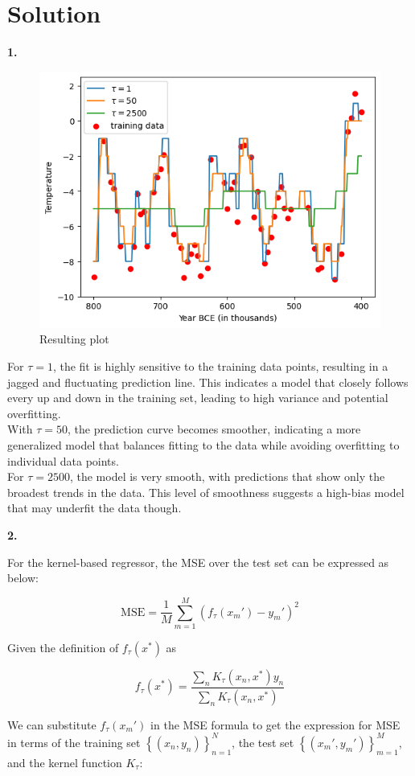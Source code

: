 \documentclass[submit]{harvardml}
\newenvironment{solution}
  {\color{blue}\section*{Solution}}
{}
\begin{document}
\begin{solution}

\textbf{1.}

\begin{figure}[h]
    \centering
    \includegraphics[width=0.5\linewidth]{image.png}
    \caption{Resulting plot}
    \label{fig:enter-label}
\end{figure}

For \(\tau = 1\), the fit is highly sensitive to the training data points, resulting in a jagged and fluctuating prediction line. This indicates a model that closely follows every up and down in the training set, leading to high variance and potential overfitting.\\

With \(\tau = 50\), the prediction curve becomes smoother, indicating a more generalized model that balances fitting to the data while avoiding overfitting to individual data points.\\

For \(\tau = 2500\), the model is very smooth, with predictions that show only the broadest trends in the data. This level of smoothness suggests a high-bias model that may underfit the data though.

\bigskip
\textbf{2.}

For the kernel-based regressor, the MSE over the test set can be expressed as below:

$$
\text{MSE} = \frac{1}{M} \sum_{m=1}^M \left(f_\tau(x_m') - y_m'\right)^2
$$

Given the definition of \(f_\tau(x^*)\) as

$$
f_\tau\left(x^*\right)=\frac{\sum_n K_\tau\left(x_n, x^*\right) y_n}{\sum_n K_\tau\left(x_n, x^*\right)}
$$

We can substitute \(f_\tau(x_m')\) in the MSE formula to get the expression for MSE in terms of the training set \(\left\{\left(x_n, y_n\right)\right\}_{n=1}^N\), the test set \(\left\{\left(x_m', y_m'\right)\right\}_{m=1}^M\), and the kernel function \(K_\tau\):


\end{solution}
\end{document}
